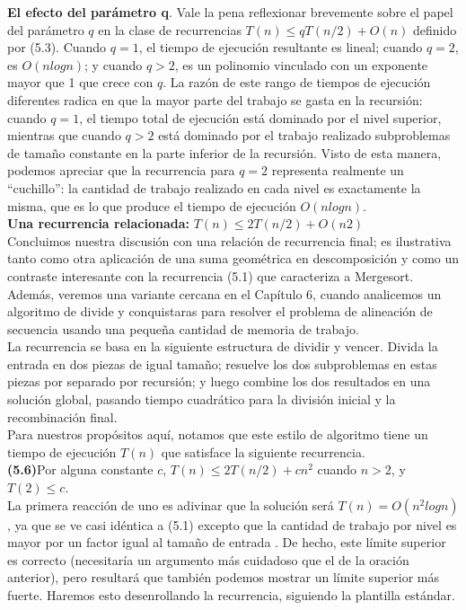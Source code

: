 \documentclass[a4paper, 12pt]{book}
\theoremstyle{dotless}
\begin{document}
\textbf{El efecto del parámetro q}. Vale la pena reflexionar brevemente sobre el papel del parámetro $q$ en la clase de recurrencias $T (n) ≤ qT (n / 2) + O (n)$ definido por (5.3). Cuando $q = 1$, el tiempo de ejecución resultante es lineal; cuando $q = 2$, es $O (n log n)$; y cuando $q> 2$, es un polinomio vinculado con un exponente mayor que 1 que crece con $q$. La razón de este rango de tiempos de ejecución diferentes radica en que la mayor parte del trabajo se gasta en la recursión: cuando $q = 1$, el tiempo total de ejecución está dominado por el nivel superior, mientras que cuando $q> 2$ está dominado por el trabajo realizado subproblemas de tamaño constante en la parte inferior de la recursión. Visto de esta manera, podemos apreciar que la recurrencia para $q = 2$ representa realmente un ``cuchillo'': la cantidad de trabajo realizado en cada nivel es exactamente la misma, que es lo que produce el tiempo de ejecución $O (n log n)$.\\

\textbf{Una recurrencia relacionada:} $T (n) ≤ 2T (n / 2) + O (n2)$\\
Concluimos nuestra discusión con una relación de recurrencia final; es ilustrativa tanto como otra aplicación de una suma geométrica en descomposición y como un contraste interesante con la recurrencia (5.1) que caracteriza a Mergesort. Además, veremos una variante cercana en el Capítulo 6, cuando analicemos un algoritmo de divide y conquistaras para resolver el problema de alineación de secuencia usando una pequeña cantidad de memoria de trabajo.\\

La recurrencia se basa en la siguiente estructura de dividir y vencer. Divida la entrada en dos piezas de igual tamaño; resuelve los dos subproblemas en estas piezas por separado por recursión; y luego combine los dos resultados en una solución global, pasando tiempo cuadrático para la división inicial y la recombinación final.\\

Para nuestros propósitos aquí, notamos que este estilo de algoritmo tiene un tiempo de ejecución $T (n)$ que satisface la siguiente recurrencia.\\
\textbf{(5.6)}Por alguna constante $c$, $T(n) ≤ 2T(n/2) + cn^2$ cuando $n> 2$, y $T(2) ≤ c$.\\

La primera reacción de uno es adivinar que la solución será $T (n) = O (n^2 log n)$, ya que se ve casi idéntica a (5.1) excepto que la cantidad de trabajo por nivel es mayor por un factor igual al tamaño de entrada . De hecho, este límite superior es correcto (necesitaría un argumento más cuidadoso que el de la oración anterior), pero resultará que también podemos mostrar un límite superior más fuerte. Haremos esto desenrollando la recurrencia, siguiendo la plantilla estándar.\\
\end{document}
